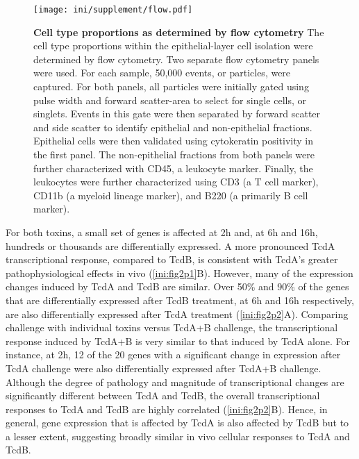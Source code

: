 \begin{figure}[h!]
  \centering
    \texttt{[image: ini/supplement/flow.pdf]}
  \caption[Cell type proportions as determined by flow cytometry]
  {\textbf{Cell type proportions as determined by flow cytometry}
  The cell type proportions within the epithelial-layer cell isolation
were determined by flow cytometry. Two
separate flow cytometry panels were used. For each sample, 50,000
events, or particles, were captured. 
For both panels, all particles were initially gated using pulse 
width and forward scatter-area to select for single 
cells, or singlets.  Events in this gate were then separated 
by forward scatter and side scatter to identify epithelial 
and non-epithelial fractions.  Epithelial cells were then 
validated using cytokeratin positivity in the first panel.  
The non-epithelial fractions from both panels were further characterized
with CD45, a leukocyte marker. Finally, the leukocytes were further characterized
using CD3 (a T cell marker), CD11b (a myeloid lineage marker), and 
B220 (a primarily B cell marker).}
  \label{ini:fig:flow}
\end{figure}


For both toxins, a small set of genes is affected at 2h and, at 6h 
and 16h, hundreds or thousands are differentially expressed. A more 
pronounced TcdA transcriptional response, compared to TcdB, is 
consistent with TcdA's greater pathophysiological effects in vivo 
(\autoref{ini:fig2p1}B). However, many of the expression changes 
induced by TcdA and TcdB are similar. Over 50\% and 90\% of the 
genes that are differentially expressed after TcdB treatment, at 
6h and 16h respectively, are also differentially expressed after 
TcdA treatment (\autoref{ini:fig2p2}A). Comparing challenge with 
individual toxins versus TcdA+B challenge, the transcriptional 
response induced by TcdA+B is very similar to that induced by TcdA 
alone. For instance, at 2h, 12 of the 20 genes with a significant 
change in expression after TcdA challenge were also differentially 
expressed after TcdA+B challenge. Although the degree of pathology 
and magnitude of transcriptional changes are significantly 
different between TcdA and TcdB, the overall transcriptional 
responses to TcdA and TcdB are highly correlated (\autoref{ini:fig2p2}B). 
Hence, in general, gene expression that is affected by TcdA is also 
affected by TcdB but to a lesser extent, suggesting broadly similar 
in vivo cellular responses to TcdA and TcdB.

